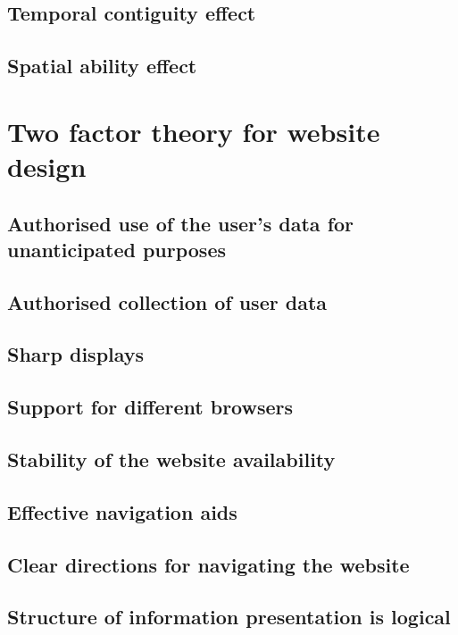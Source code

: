         \subsection{Temporal contiguity effect}

        \subsection{Spatial ability effect}


    \section{Two factor theory for website design}

        \subsection{Authorised use of the user's data for unanticipated purposes}

        \subsection{Authorised collection of user data}

        \subsection{Sharp displays}

        \subsection{Support for different browsers}

        \subsection{Stability of the website availability}

        \subsection{Effective navigation aids}

        \subsection{Clear directions for navigating the website}

        \subsection{Structure of information presentation is logical}

